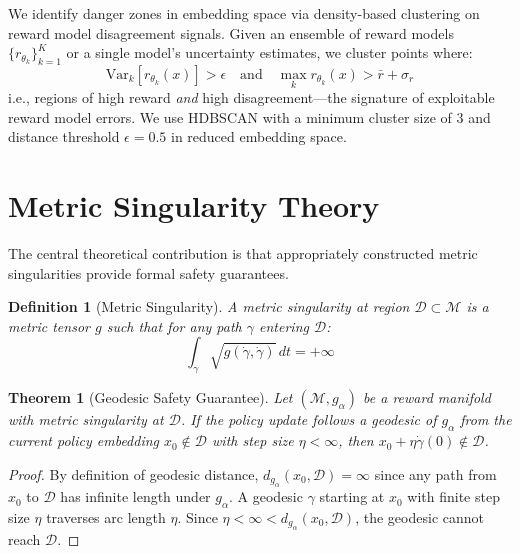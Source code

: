 \documentclass{article}
\newtheorem{theorem}{Theorem}
\newtheorem{definition}{Definition}
\begin{document}
We identify danger zones in embedding space via density-based clustering on reward model disagreement signals. Given an ensemble of reward models $\{r_{\theta_k}\}_{k=1}^K$ or a single model's uncertainty estimates, we cluster points where:
\begin{equation}
    \text{Var}_k[r_{\theta_k}(x)] > \epsilon \quad \text{and} \quad \max_k r_{\theta_k}(x) > \bar{r} + \sigma_r
\end{equation}
i.e., regions of high reward \emph{and} high disagreement---the signature of exploitable reward model errors. We use HDBSCAN with a minimum cluster size of 3 and distance threshold $\epsilon = 0.5$ in reduced embedding space.

\section{Metric Singularity Theory}
\label{sec:singularity}

The central theoretical contribution is that appropriately constructed metric singularities provide formal safety guarantees.

\begin{definition}[Metric Singularity]
A \emph{metric singularity} at region $\mathcal{D} \subset \mathcal{M}$ is a metric tensor $g$ such that for any path $\gamma$ entering $\mathcal{D}$:
\begin{equation}
    \int_\gamma \sqrt{g(\dot{\gamma}, \dot{\gamma})} \, dt = +\infty
\end{equation}
\end{definition}

\begin{theorem}[Geodesic Safety Guarantee]
\label{thm:geodesic_safety}
Let $(\mathcal{M}, g_\alpha)$ be a reward manifold with metric singularity at $\mathcal{D}$. If the policy update follows a geodesic of $g_\alpha$ from the current policy embedding $x_0 \notin \mathcal{D}$ with step size $\eta < \infty$, then $x_0 + \eta \dot{\gamma}(0) \notin \mathcal{D}$.
\end{theorem}

\begin{proof}
By definition of geodesic distance, $d_{g_\alpha}(x_0, \mathcal{D}) = \infty$ since any path from $x_0$ to $\mathcal{D}$ has infinite length under $g_\alpha$. A geodesic $\gamma$ starting at $x_0$ with finite step size $\eta$ traverses arc length $\eta$. Since $\eta < \infty < d_{g_\alpha}(x_0, \mathcal{D})$, the geodesic cannot reach $\mathcal{D}$.
\end{proof}
\end{document}
